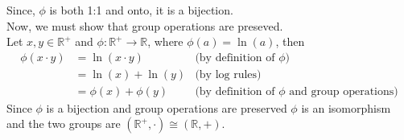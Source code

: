 \begin{enumerate}[(a)]
	Since, $\phi$ is both 1:1 and onto, it is a bijection. 
	\\
	Now, we must show that group operations are preseved.
	\\
	Let $x, y \in {\mathbb R}^+$ and $\phi: {\mathbb R}^+ \rightarrow {\mathbb R}$, where $\phi(a) = \ln(a)$, then
	\\
	\begin{align*}
	\phi(x \cdot y) &= \ln(x \cdot y) &\text{(by definition of\ } \phi)
	\\
	&= \ln(x) + \ln(y) &\text{(by log rules)}
	\\
	&= \phi(x) + \phi(y) &\text{(by definition of\ } \phi \text{\ and group operations)}
	\end{align*}
	Since $\phi$ is a bijection and group operations are preserved $\phi$ is an isomorphism and the two groups are $({\mathbb R}^+, \cdot) \cong ({\mathbb R}, +)$.
	
\end{enumerate}

